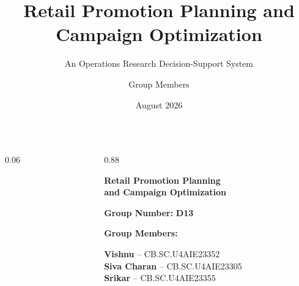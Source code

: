 \documentclass[aspectratio=169,10pt]{beamer}
\title{Retail Promotion Planning and Campaign Optimization}
\subtitle{An Operations Research Decision-Support System}
\author{Group Members}
\institute{Amrita School of Artificial Intelligence\\Amrita Vishwa Vidyapeetham, Coimbatore}
\date{August 2026}
\begin{document}
\begin{frame}[plain]

\vspace{0.65cm}

\begin{columns}[c]

\begin{column}{0.06\textwidth}
\end{column}

\begin{column}{0.88\textwidth}

{\fontsize{26}{31}\selectfont
\color{Navy}
\textbf{Retail Promotion Planning}}\\[-1mm]

{\fontsize{26}{31}\selectfont
\color{Navy}
\textbf{and Campaign Optimization}}

\vspace{0.55cm}

{\large
\textbf{Group Number:} \color{Teal}\textbf{D13}
}

\vspace{0.35cm}

{\large
\color{Navy}
\textbf{Group Members:}
}

\vspace{0.18cm}

{\normalsize
\textbf{Vishnu} -- CB.SC.U4AIE23352\\[2.5mm]
\textbf{Siva Charan} -- CB.SC.U4AIE23305\\[2.5mm]
\textbf{Srikar} -- CB.SC.U4AIE23355
}

\end{column}

\end{columns}

\end{frame}
\end{document}
